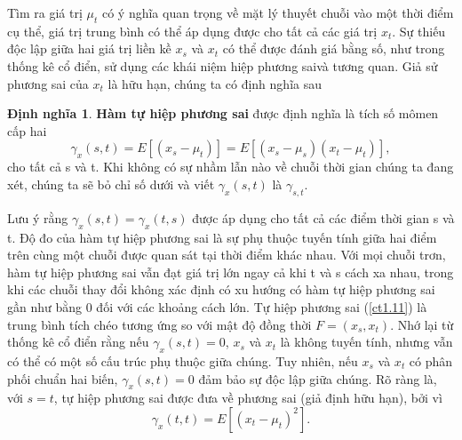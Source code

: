 \documentclass[12pt, a4paper,oneside]{book}
\theoremstyle{definition}
\newtheorem{dn}[theo]{Định nghĩa}
\begin{document}
Tìm ra giá trị $\mu_{t}$ có ý nghĩa quan trọng về mặt lý thuyết chuỗi vào một thời điểm cụ thể, giá trị trung bình có thể áp dụng được cho tất cả các giá trị $x_{t}$. Sự thiếu độc lập giữa hai giá trị liền kề $x_{s}$ và $x_{t}$ có thể được đánh giá bằng số, như trong thống kê cổ điển, sử dụng các khái niệm hiệp phương saivà tương quan. Giả sử phương sai của $x_{t}$ là hữu hạn, chúng ta có định nghĩa sau
\begin{dn}\textbf{Hàm tự hiệp phương sai} được định nghĩa là tích số mômen cấp hai
	\begin{equation}
		\gamma_{x}(s,t) = E [(x_{s} - \mu_{t})]=E[(x_{s}-\mu_{s})(x_{t}-\mu_{t})], \label{ct1.11}
	\end{equation}
cho tất cả s và t. Khi không có sự nhầm lẫn nào về chuỗi thời gian chúng ta đang xét, chúng ta sẽ bỏ chỉ số dưới và viết $\gamma_{x}(s,t)$ là $ \gamma_{s,t}.$
\end{dn}

Lưu ý rằng $\gamma_{x}(s,t) =\gamma_{x}(t,s)$ được áp dụng cho tất cả các điểm thời gian s và t. Độ đo của hàm tự hiệp phương sai là sự phụ thuộc tuyến tính giữa hai điểm trên cùng một chuỗi được quan sát tại thời điểm khác nhau. Với mọi chuỗi trơn, hàm tự hiệp phương sai vẫn đạt giá trị lớn ngay cả khi t và s cách xa nhau, trong khi các chuỗi thay đổi không xác định có xu hướng có hàm tự hiệp phương sai  gần như bằng 0 đối với các khoảng cách lớn. Tự hiệp phương sai (\ref{ct1.11}) là trung bình tích chéo tương ứng so với mật độ đồng thời $F=(x_{s}, x_{t})$. Nhớ lại từ thống kê cổ điển rằng nếu $\gamma_{x} (s,t)= 0$, $x_{s}$ và $x_{t}$ là không tuyến tính, nhưng vẫn có thể có một số cấu trúc phụ thuộc giữa chúng. Tuy nhiên, nếu $x_{s}$ và $x_{t}$ có phân phối chuẩn hai biến, $\gamma_{x}(s,t) = 0$ đảm bảo sự độc lập giữa chúng. Rõ ràng là, với $s = t$, tự hiệp phương sai được đưa về phương sai (giả định hữu hạn), bởi vì
	\begin{equation}
		\gamma_{x}(t,t) = E [(x_{t}- \mu_{t})^2]. \label{ct1.12}
	\end{equation}
\end{document}
